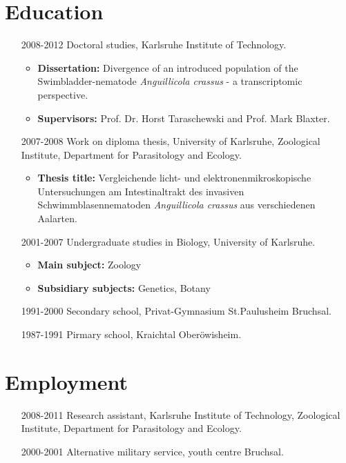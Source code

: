 \section*{Education}

\begin{itemize}
\item [2008-2012] Doctoral studies, Karlsruhe Institute of Technology.
  \begin{itemize}
  \item \textbf{Dissertation:} Divergence of an introduced population
    of the Swimbladder-nematode \textit{Anguillicola crassus} - a
    transcriptomic perspective.
  \item \textbf{Supervisors:}
    Prof. Dr. Horst Taraschewski and Prof. Mark Blaxter.
  \end{itemize}
\item [2007-2008] Work on diploma thesis, University of Karlsruhe,
  Zoological Institute, Department for Parasitology and Ecology.
  \begin{itemize}
  \item \textbf{Thesis title:} Vergleichende licht- und
    elektronenmikroskopische Untersuchungen am Intestinaltrakt des
    invasiven Schwimmblasennematoden \textit{Anguillicola crassus} aus
    verschiedenen Aalarten.
  \end{itemize}
\item [2001-2007] Undergraduate studies in Biology, University of
  Karlsruhe.
  \begin{itemize}
  \item \textbf{Main subject:} Zoology
  \item \textbf{Subsidiary subjects:} Genetics, Botany
  \end{itemize}
\item [1991-2000] Secondary school, Privat-Gymnasium St.Paulusheim
  Bruchsal.
\item [1987-1991] Pirmary school, Kraichtal Ober\"owisheim.
\end{itemize}

\section*{Employment}

\begin{itemize}
\item [2008-2011] Research assistant, Karlsruhe Institute of
  Technology, Zoological Institute, Department for Parasitology and
  Ecology.
\item [2000-2001] Alternative military service, youth centre Bruchsal.
\end{itemize}


